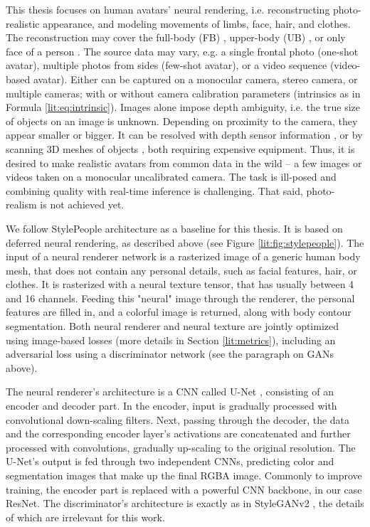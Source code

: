 This thesis focuses on human avatars' neural rendering, i.e. reconstructing photo-realistic appearance, and modeling movements of limbs, face, hair, and clothes. The reconstruction may cover the full-body (FB)  \cite{dnn:fb-cloth-avatar21, dnn:stylepeople21, dnn:anr21}, upper-body (UB) \cite{dnn:upper-avatar21}, or only face of a person \cite{dnn:volumetric-primitives21, dnn:hyperstyle21}. The source data may vary, e.g. a single frontal photo (one-shot avatar), multiple photos from sides (few-shot avatar), or a video sequence (video-based avatar). Either can be captured on a monocular camera\cite{dnn:stylepeople21}, stereo camera\cite{dnn:stereo-avatars11}, or multiple cameras\cite{dnn:volumetric-primitives21, dnn:textured-avatars19}; with or without camera calibration parameters (intrinsics as in Formula \ref{lit:eq:intrinsic}). Images alone impose depth ambiguity, i.e. the true size of objects on an image is unknown. Depending on proximity to the camera, they appear smaller or bigger. It can be resolved with depth sensor information \cite{dnn:depth-avatar11}, or by scanning 3D meshes of objects \cite{dnn:phorhum22}, both requiring expensive equipment. Thus, it is desired to make realistic avatars from common data in the wild -- a few images or videos taken on a monocular uncalibrated camera. The task is ill-posed and combining quality with real-time inference is challenging. That said, photo-realism is not achieved yet. 

We follow StylePeople \cite{dnn:stylepeople21} architecture as a baseline for this thesis. It is based on deferred neural rendering, as described above (see Figure \ref{lit:fig:stylepeople}). The input of a neural renderer network is a rasterized image of a generic human body mesh, that does not contain any personal details, such as facial features, hair, or clothes. It is rasterized with a neural texture tensor, that has usually between 4 and 16 channels. Feeding this "neural" image through the renderer, the personal features are filled in, and a colorful image is returned, along with body contour segmentation. Both neural renderer and neural texture are jointly optimized using image-based losses (more details in Section \ref{lit:metrics}), including an adversarial loss using a discriminator network (see the paragraph on GANs above). 

The neural renderer's architecture is a CNN called U-Net \cite{dnn:unet15}, consisting of an encoder and decoder part. In the encoder, input is gradually processed with convolutional down-scaling filters. Next, passing through the decoder, the data and the corresponding encoder layer's activations are concatenated and further processed with convolutions, gradually up-scaling to the original resolution. The U-Net's output is fed through two independent CNNs, predicting color and segmentation images that make up the final RGBA image. Commonly to improve training, the encoder part is replaced with a powerful CNN backbone, in our case ResNet\cite{dnn:resnet-unet20,dnn:resnet16}. The discriminator's architecture is exactly as in StyleGANv2 \cite{dnn:stylegan-v2-20}, the details of which are irrelevant for this work.

